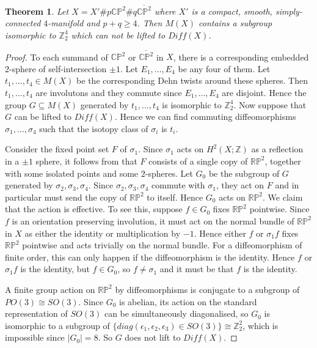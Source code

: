 \documentclass{amsart}
\newtheorem{theorem}{Theorem}[section]
\theoremstyle{definition}
\theoremstyle{remark}
\numberwithin{equation}{section}
\begin{document}
\begin{theorem}
Let $X = X' \# p \mathbb{CP}^2 \# q \overline{\mathbb{CP}^2}$ where $X'$ is a compact, smooth, simply-connected $4$-manifold and $p+q \ge 4$. Then $M(X)$ contains a subgroup isomorphic to $\mathbb{Z}_2^4$ which can not be lifted to $Diff(X)$.
\end{theorem}
\begin{proof}
To each summand of $\mathbb{CP}^2$ or $\overline{\mathbb{CP}^2}$ in $X$, there is a corresponding embedded $2$-sphere of self-intersection $\pm 1$. Let $E_1, \dots , E_4$ be any four of them. Let $t_1, \dots , t_4 \in M(X)$ be the corresponding Dehn twists around these spheres. Then $t_1,\dots , t_4$ are involutons \cite{sei} and they commute since $E_1, \dots , E_4$ are disjoint. Hence the group $G \subseteq M(X)$ generated by $t_1, \dots , t_4$ is isomorphic to $\mathbb{Z}_2^4$. Now suppose that $G$ can be lifted to $Diff(X)$. Hence we can find commuting diffeomorphisms $\sigma_1, \dots , \sigma_4$ such that the isotopy class of $\sigma_i$ is $t_i$.

Consider the fixed point set $F$ of $\sigma_1$. Since $\sigma_1$ acts on $H^2(X ; \mathbb{Z})$ as a reflection in a $\pm 1$ sphere, it follows from \cite[Proposition 2.4]{ed} that $F$ consists of a single copy of $\mathbb{RP}^2$, together with some isolated points and some $2$-spheres. Let $G_0$ be the subgroup of $G$ generated by $\sigma_2, \sigma_3, \sigma_4$. Since $\sigma_2, \sigma_3, \sigma_4$ commute with $\sigma_1$, they act on $F$ and in particular must send the copy of $\mathbb{RP}^2$ to itself. Hence $G_0$ acts on $\mathbb{RP}^2$. We claim that the action is effective. To see this, suppose $f \in G_0$ fixes $\mathbb{RP}^2$ pointwise. Since $f$ is an orientation preserving involution, it must act on the normal bundle of $\mathbb{RP}^2$ in $X$ as either the identity or multiplication by $-1$. Hence either $f$ or $\sigma_1 f$ fixes $\mathbb{RP}^2$ pointwise and acts trivially on the normal bundle. For a diffeomorphism of finite order, this can only happen if the diffeomorphism is the identity. Hence $f$ or $\sigma_1 f$ is the identity, but $f \in G_0$, so $f \neq \sigma_1$ and it must be that $f$ is the identity.

A finite group action on $\mathbb{RP}^2$ by diffeomorphisms is conjugate to a subgroup of $PO(3) \cong SO(3)$. Since $G_0$ is abelian, its action on the standard representation of $SO(3)$ can be simultaneously diagonalised, so $G_0$ is isomorphic to a subgroup of $\{ diag( \epsilon_1 , \epsilon_2 , \epsilon_3 ) \in SO(3) \} \cong \mathbb{Z}_2^2$, which is impossible since $|G_0| = 8$. So $G$ does not lift to $Diff(X)$.
\end{proof}
\end{document}
